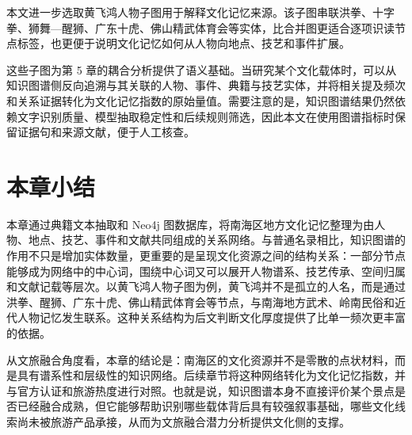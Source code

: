 本文进一步选取黄飞鸿人物子图用于解释文化记忆来源。该子图串联洪拳、十字拳、狮舞---醒狮、广东十虎、佛山精武体育会等实体，比合并图更适合逐项识读节点标签，也更便于说明文化记忆如何从人物向地点、技艺和事件扩展。

这些子图为第 5 章的耦合分析提供了语义基础。当研究某个文化载体时，可以从知识图谱侧反向追溯与其关联的人物、事件、典籍与技艺实体，并将相关提及频次和关系证据转化为文化记忆指数的原始量值。需要注意的是，知识图谱结果仍然依赖文字识别质量、模型抽取稳定性和后续规则筛选，因此本文在使用图谱指标时保留证据句和来源文献，便于人工核查。

\section{本章小结}\label{chap04-summary}

本章通过典籍文本抽取和 Neo4j 图数据库，将南海区地方文化记忆整理为由人物、地点、技艺、事件和文献共同组成的关系网络。与普通名录相比，知识图谱的作用不只是增加实体数量，更重要的是呈现文化资源之间的结构关系：一部分节点能够成为网络中的中心词，围绕中心词又可以展开人物谱系、技艺传承、空间归属和文献记载等层次。以黄飞鸿人物子图为例，黄飞鸿并不是孤立的人名，而是通过洪拳、醒狮、广东十虎、佛山精武体育会等节点，与南海地方武术、岭南民俗和近代人物记忆发生联系。这种关系结构为后文判断文化厚度提供了比单一频次更丰富的依据。

从文旅融合角度看，本章的结论是：南海区的文化资源并不是零散的点状材料，而是具有谱系性和层级性的知识网络。后续章节将这种网络转化为文化记忆指数，并与官方认证和旅游热度进行对照。也就是说，知识图谱本身不直接评价某个景点是否已经融合成熟，但它能够帮助识别哪些载体背后具有较强叙事基础，哪些文化线索尚未被旅游产品承接，从而为文旅融合潜力分析提供文化侧的支撑。

